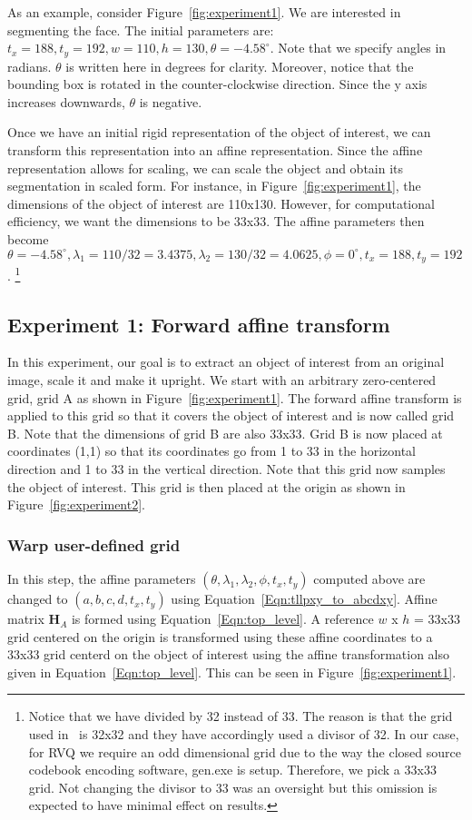 As an example, consider Figure~\ref{fig:experiment1}.  We are interested in segmenting the face.  The initial parameters are: $t_x=188, t_y=192, w=110, h=130, \theta=-4.58^\circ$.  Note that we specify angles in radians.  $\theta$ is written here in degrees for clarity.  Moreover, notice that the bounding box is rotated in the counter-clockwise direction.  Since the y axis increases downwards, $\theta$ is negative.

Once we have an initial rigid representation of the object of interest, we can transform this representation into an affine representation.  Since the affine representation allows for scaling, we can scale the object and obtain its segmentation in scaled form.  For instance, in Figure~\ref{fig:experiment1}, the dimensions of the object of interest are 110x130.  However, for computational efficiency, we want the dimensions to be 33x33.  The affine parameters then become $\theta=-4.58^\circ, \lambda_1=110/32=3.4375, \lambda_2=130/32=4.0625, \phi=0^\circ, t_x=188, t_y=192$.  \footnote{Notice that we have divided by 32 instead of 33.  The reason is that the grid used in~\cite{2008_JNL_subspaceTRK_Ross} is 32x32 and they have accordingly used a divisor of 32.  In our case, for RVQ we require an odd dimensional grid due to the way the closed source codebook encoding software, gen.exe is setup.  Therefore, we pick a 33x33 grid.  Not changing the divisor to 33 was an oversight but this omission is expected to have minimal effect on results.}


\subsection{Experiment 1: Forward affine transform}
In this experiment, our goal is to extract an object of interest from an original image, scale it and make it upright.  We start with an arbitrary zero-centered grid, grid A as shown in Figure~\ref{fig:experiment1}.  The forward affine transform is applied to this grid so that it covers the object of interest and is now called grid B.  Note that the dimensions of grid B are also 33x33.  Grid B is now placed at coordinates (1,1) so that its coordinates go from 1 to 33 in the horizontal direction and 1 to 33 in the vertical direction.  Note that this grid now samples the object of interest.  This grid is then placed at the origin as shown in Figure~\ref{fig:experiment2}.  

\subsubsection{Warp user-defined grid}
In this step, the affine parameters $(\theta, \lambda_1, \lambda_2, \phi, t_x, t_y)$ computed above are changed to $(a, b, c, d, t_x, t_y)$ using Equation~\ref{Eqn:tllpxy_to_abcdxy}.  Affine matrix $\mathbf{H}_A$ is formed using Equation~\ref{Eqn:top_level}.  A reference $w$ x $h$ = 33x33 grid centered on the origin is transformed using these affine coordinates to a 33x33 grid centerd on the object of interest using the affine transformation also given in Equation~\ref{Eqn:top_level}.  This can be seen in Figure~\ref{fig:experiment1}.

